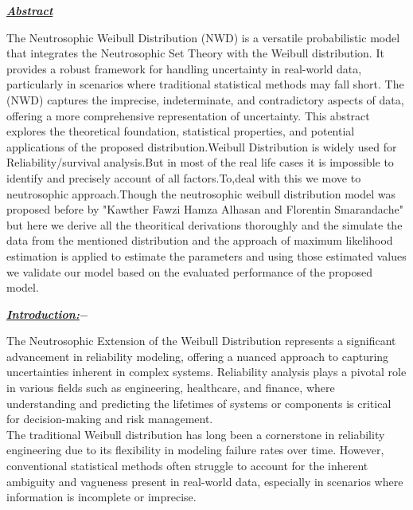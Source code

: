 \documentclass[12pt,a4paper,oneside]{article}
\author{Saunak Mitra}
\begin{document}
\vspace*{3cm}
\begin{singlespace}
\begin{Large}
\hspace*{6cm}\textrm{\textit{\textbf{\underline{Abstract}}}}
\end{Large}
\end{singlespace}
\vspace*{1cm}
The Neutrosophic Weibull Distribution (NWD) is a versatile probabilistic model that integrates the Neutrosophic Set Theory with the Weibull distribution. It provides a robust framework for handling uncertainty in real-world data, particularly in scenarios where traditional statistical methods may fall short. The (NWD) captures the imprecise, indeterminate, and contradictory aspects of data, offering a more comprehensive representation of uncertainty. This abstract explores the theoretical foundation, statistical properties, and potential applications of the proposed distribution.Weibull Distribution is widely used for Reliability/survival analysis.But in most of the real life cases it is impossible to identify and precisely account of all factors.To,deal with this we move to neutrosophic approach.Though the neutrosophic weibull distribution model was proposed before by "Kawther Fawzi Hamza Alhasan and Florentin Smarandache" but here we derive all the theoritical derivations thoroughly and the simulate the data from the mentioned distribution and the approach of maximum likelihood estimation is applied to estimate the parameters and using those estimated values we validate our model based on the evaluated performance of the proposed model.
\newpage
\begin{singlespace}
\begin{Large}
\textrm{\textit{\textbf{\underline{Introduction:$-$}}}}
\end{Large}
\end{singlespace}
\vspace*{5mm}
The Neutrosophic Extension of the Weibull Distribution represents a significant advancement in reliability modeling, offering a nuanced approach to capturing uncertainties inherent in complex systems. Reliability analysis plays a pivotal role in various fields such as engineering, healthcare, and finance, where understanding and predicting the lifetimes of systems or components is critical for decision-making and risk management.\\

The traditional Weibull distribution has long been a cornerstone in reliability engineering due to its flexibility in modeling failure rates over time. However, conventional statistical methods often struggle to account for the inherent ambiguity and vagueness present in real-world data, especially in scenarios where information is incomplete or imprecise.\\
\end{document}
